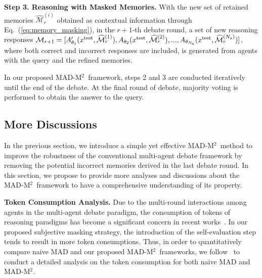 \documentclass{article} %
\newcommand{\methodname}{MAD-M$^2$}
\newcommand{\uprmvar}[2]{#1^{\rm #2}}
\theoremstyle{plain}
\begin{document}
\textbf{Step 3. Reasoning with Masked Memories.} With the new set of retained memories $\widehat{\mathcal{M}}^{(i)}_{r}$ obtained as contextual information through Eq.~(\ref{eq:memory_masking}), in the $r+1$-th debate round, a set of new reasoning responses $\mathcal{M}_{r+1}=[A^{\prime}_{\theta_1}(\uprmvar{x}{test}, \widehat{\mathcal{M}}^{(1)}_{r}), A_{\theta_2}(\uprmvar{x}{test}, \widehat{\mathcal{M}}^{(2)}_{r}), ..., A_{\theta_{N_{\rm a}}}(\uprmvar{x}{test}, \widehat{\mathcal{M}}^{(N_{\rm a})}_{r})]$, where both correct and incorrect responses are included, is generated from agents with the query and the refined memories. 

In our proposed \methodname\ framework, steps 2 and 3 are conducted iteratively until the end of the debate. At the final round of debate, majority voting is performed to obtain the answer to the query.

\vspace{-6pt}
\subsection{More Discussions}
\label{subsec:dicussion}
\vspace{-4pt}
In the previous section, we introduce a simple yet effective \methodname\ method to improve the robustness of the conventional multi-agent debate framework by removing the potential incorrect memories derived in the last debate round. In this section, we propose to provide more analyses and discussions about the \methodname\ framework to have a comprehensive understanding of its property.

\textbf{Token Consumption Analysis.} Due to the multi-round interactions among agents in the multi-agent debate paradigm, the consumption of tokens of reasoning paradigms has become a significant concern in recent works~\citep{groupdebate,s2_mad}. In our proposed subjective masking strategy, the introduction of the self-evaluation step tends to result in more token consumptions. Thus, in order to quantitatively compare naive MAD and our proposed \methodname\ frameworks, we follow~\cite{groupdebate} to conduct a detailed analysis on the token consumption for both naive MAD and \methodname.
\end{document}
